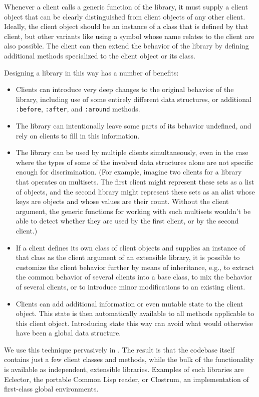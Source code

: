 Whenever a client calls a generic function of the library, it must supply a
client object that can be clearly distinguished from client objects of any
other client.  Ideally, the client object should be an instance of a class
that is defined by that client, but other variants like using a symbol
whose name relates to the client are also possible.  The client can then
extend the behavior of the library by defining additional methods
specialized to the client object or its class.

Designing a library in this way has a number of benefits:

\begin{itemize}
\item Clients can introduce very deep changes to the original behavior of
  the library, including use of some entirely different data structures, or
  additional \texttt{:before}, \texttt{:after}, and \texttt{:around}
  methods.
\item The library can intentionally leave some parts of its behavior
  undefined, and rely on clients to fill in this information.
\item The library can be used by multiple clients simultaneously, even in
  the case where the types of some of the involved data structures alone
  are not specific enough for discrimination.  (For example, imagine two
  clients for a library that operates on multisets.  The first client might
  represent these sets as a list of objects, and the second library might
  represent these sets as an alist whose keys are objects and whose values
  are their count.  Without the client argument, the generic functions for
  working with such multisets wouldn't be able to detect whether they are
  used by the first client, or by the second client.)
\item If a client defines its own class of client objects and supplies an
  instance of that class as the client argument of an extensible library,
  it is possible to customize the client behavior further by means of
  inheritance, e.g., to extract the common behavior of several clients into
  a base class, to mix the behavior of several clients, or to introduce
  minor modifications to an existing client.
\item Clients can add additional information or even mutable state to the
  client object.  This state is then automatically available to all methods
  applicable to this client object.  Introducing state this way can avoid
  what would otherwise have been a global data structure.
\end{itemize}

We use this technique pervasively in {\sysname}.  The result is that the
{\sysname} codebase itself contains just a few client classes and methods,
while the bulk of the functionality is available as independent, extensible
libraries.  Examples of such libraries are Eclector, the portable Common
Lisp reader, or Clostrum, an implementation of first-class global
environments.
